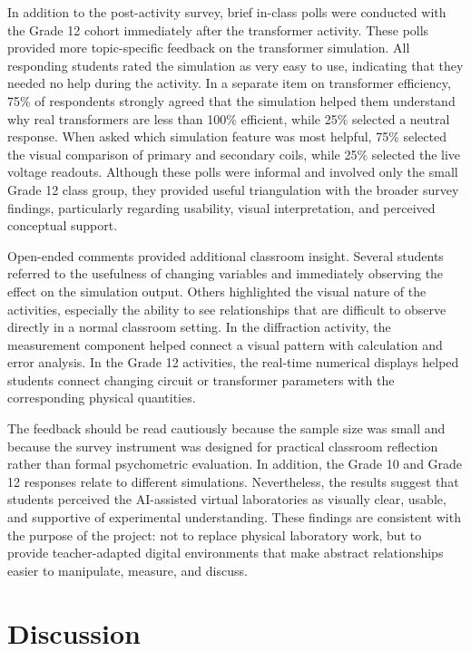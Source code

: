 \documentclass{iopjournal}
\begin{document}
In addition to the post-activity survey, brief in-class polls were conducted with the Grade 12 cohort immediately after the transformer activity. These polls provided more topic-specific feedback on the transformer simulation. All responding students rated the simulation as very easy to use, indicating that they needed no help during the activity. In a separate item on transformer efficiency, 75\% of respondents strongly agreed that the simulation helped them understand why real transformers are less than 100\% efficient, while 25\% selected a neutral response. When asked which simulation feature was most helpful, 75\% selected the visual comparison of primary and secondary coils, while 25\% selected the live voltage readouts. Although these polls were informal and involved only the small Grade 12 class group, they provided useful triangulation with the broader survey findings, particularly regarding usability, visual interpretation, and perceived conceptual support.

Open-ended comments provided additional classroom insight. Several students referred to the usefulness of changing variables and immediately observing the effect on the simulation output. Others highlighted the visual nature of the activities, especially the ability to see relationships that are difficult to observe directly in a normal classroom setting. In the diffraction activity, the measurement component helped connect a visual pattern with calculation and error analysis. In the Grade 12 activities, the real-time numerical displays helped students connect changing circuit or transformer parameters with the corresponding physical quantities.

The feedback should be read cautiously because the sample size was small and because the survey instrument was designed for practical classroom reflection rather than formal psychometric evaluation. In addition, the Grade 10 and Grade 12 responses relate to different simulations. Nevertheless, the results suggest that students perceived the AI-assisted virtual laboratories as visually clear, usable, and supportive of experimental understanding. These findings are consistent with the purpose of the project: not to replace physical laboratory work, but to provide teacher-adapted digital environments that make abstract relationships easier to manipulate, measure, and discuss.

\section{Discussion}
\end{document}
